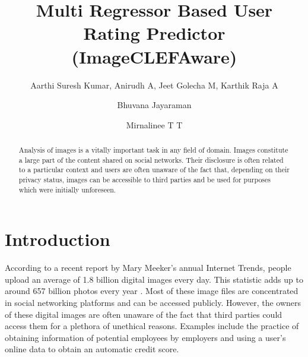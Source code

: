 \documentclass{llncs}
\begin{document}


\title{Multi Regressor Based User Rating Predictor (ImageCLEFAware)}


\author{ Aarthi Suresh Kumar, Anirudh A, Jeet Golecha M, Karthik Raja A \and Bhuvana Jayaraman  \and Mirnalinee T T }


\maketitle
\begin{abstract}
Analysis of images is a vitally important task in any field of domain.
Images constitute a large part of the content shared on social networks. Their disclosure is often related to a particular context and users are often unaware of the fact that, depending on their privacy status, images can be accessible to third parties and be used for purposes which were initially unforeseen.

\end{abstract}

\section{Introduction}  
According to a recent report by Mary Meeker's annual Internet Trends, people upload an average of 1.8 billion digital images every day. This statistic adds up to around 657 billion photos every year \cite{photoNum}. Most of these image files are concentrated in social networking platforms and can be accessed publicly. However, the owners of these digital images are often unaware of the fact that third parties could access them for a plethora of unethical reasons. Examples include the practice of obtaining information of potential employees by employers and using a user's online data to obtain an automatic credit score. 
\end{document}
